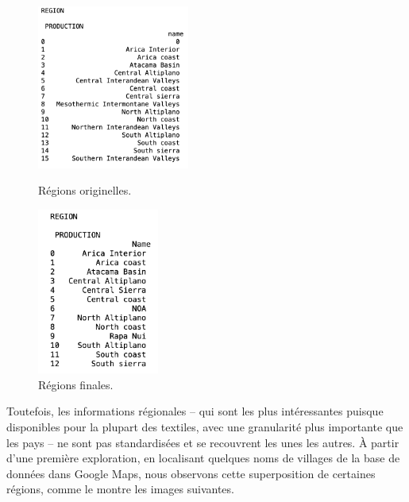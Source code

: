   \begin{figure}[!h]
    \begin{minipage}[c]{.5\linewidth}
            \begin{center}
                \includegraphics[width=5cm]{../images/regions_orig.png}
            \end{center}
            \caption{Régions originelles.}
            \label{fig:region_orig}   
    \end{minipage}
        \begin{minipage}[c]{.5\linewidth}
        \begin{center}
        		\includegraphics[width=4cm]{../images/regions_fin.png}
	\end{center}
	\caption{Régions finales.}
	\label{fig:region_fin}   
    \end{minipage}
\end{figure}
  
 Toutefois, les informations régionales -- qui sont les plus intéressantes puisque disponibles pour la plupart des textiles, avec une granularité plus importante que les pays -- ne sont pas standardisées et se recouvrent les unes les autres. À partir d'une première exploration, en localisant quelques noms de villages de la base de données dans Google Maps, nous observons cette superposition de certaines régions, comme le montre les images suivantes.
 
 \clearpage
 
